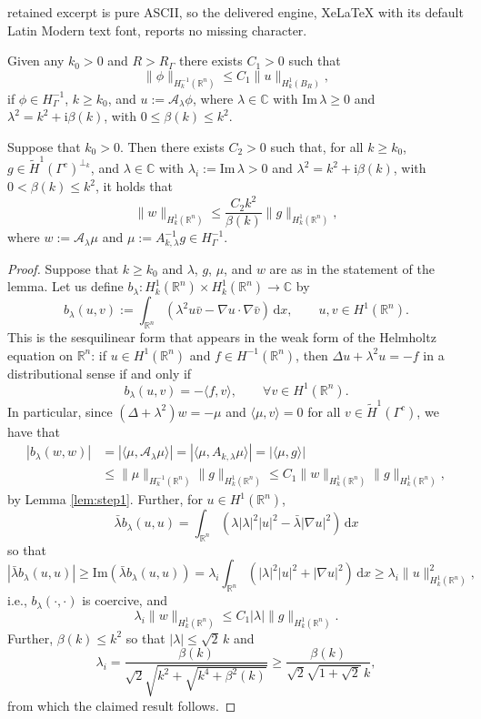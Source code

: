 \documentclass[10pt,a4paper]{amsart}
\newcommand{\C}{\mathbb{C}}
\newcommand{\R}{\mathbb{R}}
\newcommand{\cA}{\mathcal{A}}
\newcommand{\rd}{\mathrm{d}}
\newcommand{\ri}{\mathrm{i}}
\begin{document}
retained excerpt is pure ASCII, so the delivered engine, XeLaTeX with its default Latin Modern text font, reports no missing character.
\begin{lemma} \label{lem:step1} Given any $k_0>0$ and $R>R_\Gamma$ there exists $C_1>0$ such that
$$
\|\phi\|_{H_k^{-1}(\R^n)} \leq C_1 \|u\|_{H^1_k(B_R)},
$$
if $\phi\in H^{-1}_\Gamma$, $k\geq k_0$, and $u:= \cA_\lambda \phi$, where $\lambda\in \C$ with $\mathrm{Im}\,\lambda \geq 0$ and $\lambda^2=k^2+\ri \beta(k)$, with $0\leq \beta(k)\leq k^2$. 
\end{lemma}

\begin{lemma} \label{lem:step2} Suppose that  $k_0>0$. Then  there exists $C_2>0$ such that, for all  $k\geq k_0$, $g\in \widetilde H^1(\Gamma^c)^{\perp_k}$, and 
$\lambda\in \C$ with $\lambda_i := \mathrm{Im}\, \lambda >0$ and $\lambda^2=k^2+\ri \beta(k)$, with $0<\beta(k)\leq k^2$,  it holds that
$$
\|w\|_{H^1_k(\R^n)} \leq \frac{C_2k^2}{\beta(k)} \|g\|_{H^1_k(\R^n)},
$$ 
where $w:= \cA_\lambda \mu$ and $\mu:= A_{k,\lambda}^{-1}g\in H^{-1}_\Gamma$.
\end{lemma}

\begin{proof} Suppose that $k\geq k_0$ and $\lambda$, $g$, $\mu$, and $w$ are as in the statement of the lemma. Let us define $b_\lambda: H_k^1(\mathbb{R}^n)\times H_k^1(\mathbb{R}^n)\rightarrow\mathbb{C}$ by
\begin{equation*}
 b_\lambda(u,v):=\int_{\R^n}\left(\lambda^2 u \bar v - \nabla u\cdot \nabla \bar v\right)\, \rd x, \qquad u,v \in H^1(\R^n).
\end{equation*}
This is the sesquilinear form that appears in the weak form of the Helmholtz equation on $\R^n$: 
if $u\in H^1(\R^n)$ and $f\in H^{-1}(\R^n)$, then $\Delta u + \lambda^2 u = -f$ in a distributional sense if and only if
$$
b_\lambda(u,v) = -\langle f,v\rangle, \qquad \forall v\in H^1(\R^n).
$$
In particular, since $(\Delta + \lambda^2)w = - \mu$ and $\langle \mu, v\rangle =0$ for all $v\in \widetilde H^1(\Gamma^c)$, we have that
\begin{align*}
|b_\lambda(w,w)| & = |\langle \mu,\cA_\lambda \mu\rangle| = |\langle \mu, A_{k,\lambda} \mu\rangle|=|\langle \mu,g\rangle|\\ & \leq \|\mu\|_{H_k^{-1}(\R^n)} \|g\|_{H^1_k(\R^n)} \leq C_1\|w\|_{H_k^{1}(\R^n)} \|g\|_{H^1_k(\R^n)},
\end{align*}
by Lemma \ref{lem:step1}. Further, for $u\in H^1(\R^n)$,
$$
\bar \lambda b_\lambda(u,u) = \int_{\R^n}\left(\lambda |\lambda|^2 |u|^2  - \bar\lambda |\nabla u|^2\right)\, \rd x
$$
so that
$$
|\bar \lambda b_\lambda(u,u)| \geq \mathrm{Im}( \bar \lambda b_\lambda(u,u)) = \lambda_i \int_{\R^n}\left(|\lambda|^2 |u|^2  + |\nabla u|^2\right)\, \rd x \geq \lambda_i \|u\|_{H^1_k(\R^n)}^2,
$$
i.e., $b_\lambda(\cdot,\cdot)$ is coercive, and
$$
\lambda_i \|w\|_{H_k^{1}(\R^n)} \leq C_1|\lambda| \|g\|_{H^1_k(\R^n)}.
$$
Further, $\beta(k)\leq k^2$ so that $|\lambda| \leq \sqrt{2}\,k$ and
$$
\lambda_i = \frac{\beta(k)}{\sqrt{2}\sqrt{k^2+\sqrt{k^4+\beta^2(k)}}}\geq \frac{\beta(k)}{\sqrt{2}\sqrt{1+\sqrt{2}}\,k},
$$
from which the claimed result follows.
\end{proof}
\end{document}
